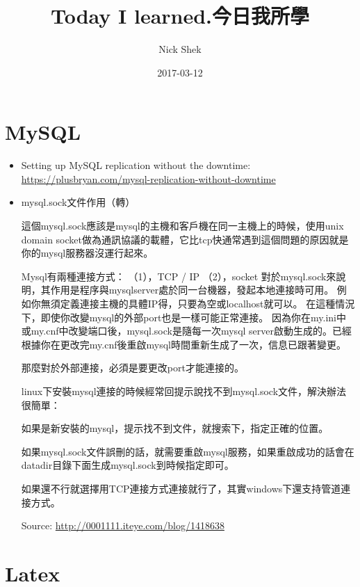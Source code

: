 \documentclass{article}
\title{Today I learned.今日我所學}
\author{Nick Shek}
\date{2017-03-12}
\begin{document}
\maketitle

\clearpage

\tableofcontents

\clearpage

\section{MySQL}

\begin{itemize}
\item Setting up MySQL replication without the downtime: \href{https://plusbryan.com/mysql-replication-without-downtime}{https://plusbryan.com/mysql-replication-without-downtime}
\item mysql.sock文件作用（轉）

這個mysql.sock應該是mysql的主機和客戶機在同一主機上的時候，使用unix domain socket做為通訊協議的載體，它比tcp快通常遇到這個問題的原因就是你的mysql服務器沒運行起來。


Mysql有兩種連接方式：
（1），TCP / IP
（2），socket
對於mysql.sock來說明，其作用是程序與mysqlserver處於同一台機器，發起本地連接時可用。
例如你無須定義連接主機的具體IP得，只要為空或localhost就可以。
在這種情況下，即使你改變mysql的外部port也是一樣可能正常連接。
因為你在my.ini中或my.cnf中改變端口後，mysql.sock是隨每一次mysql server啟動生成的。已經根據你在更改完my.cnf後重啟mysql時間重新生成了一次，信息已跟著變更。

那麼對於外部連接，必須是要更改port才能連接的。

linux下安裝mysql連接的時候經常回提示說找不到mysql.sock文件，解決辦法很簡單：

如果是新安裝的mysql，提示找不到文件，就搜索下，指定正確的位置。

如果mysql.sock文件誤刪的話，就需要重啟mysql服務，如果重啟成功的話會在datadir目錄下面生成mysql.sock到時候指定即可。

如果還不行就選擇用TCP連接方式連接就行了，其實windows下還支持管道連接方式。

Source: \href{http://0001111.iteye.com/blog/1418638}{http://0001111.iteye.com/blog/1418638}
\end{itemize}

\section{Latex}
\end{document}
